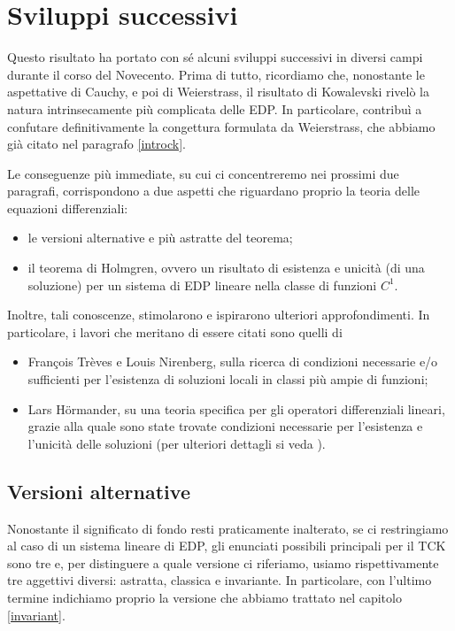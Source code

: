 \chapter{Sviluppi successivi}

Questo risultato ha portato con sé alcuni sviluppi successivi in diversi campi durante il corso del Novecento. 
Prima di tutto, ricordiamo che, nonostante le aspettative di Cauchy, e poi di Weierstrass, il risultato di Kowalevski rivelò la natura intrinsecamente più complicata delle EDP. In particolare, contribuì a confutare definitivamente la congettura formulata da Weierstrass, che abbiamo già citato nel paragrafo \ref{introck}.

Le conseguenze più immediate, su cui ci concentreremo nei prossimi due paragrafi, corrispondono a due aspetti che riguardano proprio la teoria delle equazioni differenziali:
\begin{itemize}
\item le versioni alternative e più astratte del teorema;
\item il teorema di Holmgren, ovvero un risultato di esistenza e unicità (di una soluzione) per un sistema di EDP lineare nella classe di funzioni $C^1$.
\end{itemize}

Inoltre, tali conoscenze, stimolarono e ispirarono ulteriori approfondimenti. In particolare, i lavori che meritano di essere citati sono quelli di
\begin{itemize}
\item François Trèves e Louis Nirenberg, sulla ricerca di condizioni necessarie e/o sufficienti per l'esistenza di soluzioni locali in classi più ampie di funzioni;
\item Lars Hörmander, su una teoria specifica per gli operatori differenziali lineari, grazie alla quale sono state trovate condizioni necessarie per l'esistenza e l'unicità delle soluzioni (per ulteriori dettagli si veda \cite{Hormander}).
\end{itemize}

\newpage
\section{Versioni alternative}

Nonostante il significato di fondo resti praticamente inalterato, se ci restringiamo al caso di un sistema lineare di EDP, gli enunciati possibili principali per il TCK sono tre e, per distinguere a quale versione ci riferiamo, usiamo rispettivamente tre aggettivi diversi: astratta, classica e invariante. In particolare, con l'ultimo termine indichiamo proprio la versione che abbiamo trattato nel capitolo \ref{invariant}.

